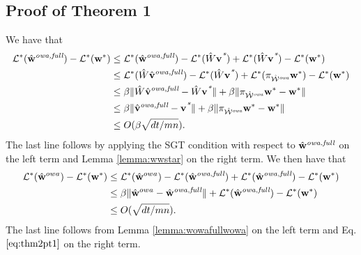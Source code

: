\documentclass[thesis.tex]{subfiles}
\begin{document}
\subsection*{Proof of Theorem 1}
We have that
\begin{align}
    \Lossstar(\wowafull) - \Lossstar(\wstar)
    & \le \Lossstar(\wowafull) - \Lossstar(\matW\vstar) + \Lossstar(\matW\vstar) - \Lossstar(\wstar)
    \\
    & \le \Lossstar(\matW\vfull) - \Lossstar(\matW\vstar) + \Lossstar(\proj{\Wowa}\wstar) -\Lossstar(\wstar)
    \\
    & \le \beta\ltwo{\matW\vfull - \matW\vstar} + \beta\ltwo{\proj{\Wowa}\wstar -\wstar}
    \\
    & \le \beta\ltwo{\vfull - \vstar} + \beta\ltwo{\proj{\Wowa}\wstar -\wstar}
    \\
    & \le O(\beta\sqrt{dt/mn})
    \label{eq:thm2pt1}
    .
\end{align}
The last line follows by applying the SGT condition with respect to $\hat{\mathbf w}^{\textit{owa,full}}$ on the left term and Lemma \ref{lemma:wwstar} on the right term.
We then have that
\begin{align}
    \mathcal{L}^*(\hat{\mathbf w}^{owa})-\mathcal{L}^*({\mathbf w^{*}})
    &\le
    \mathcal{L}^*(\hat{\mathbf w}^{owa})-\mathcal{L}^*(\hat{\mathbf w}^{\textit{owa,full}})
    +
    \mathcal{L}^*(\hat{\mathbf w}^{\textit{owa,full}})-\mathcal{L}^*({\mathbf w^{*}})
    \\
    &\le
    \beta{\lVert {\hat{\mathbf w}^{owa}-\hat{\mathbf w}^{\textit{owa,full}}} \rVert}
    +
    \mathcal{L}^*(\hat{\mathbf w}^{\textit{owa,full}})-\mathcal{L}^*({\mathbf w^{*}})
    \\
    &\le
    O(\sqrt{dt/mn}).
\end{align}
The last line follows from Lemma \ref{lemma:wowafullwowa} on the left term and Eq. $\eqref{eq:thm2pt1}$ on the right term.

\end{document}
